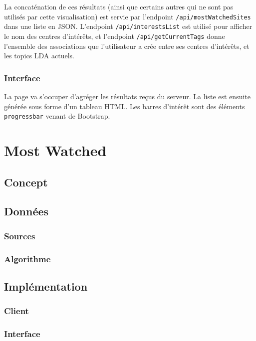 			La concaténation de ces résultats (ainsi que certains autres qui ne sont pas utilisés par cette visualisation) est servie par l'endpoint \texttt{/api/mostWatchedSites} dans une liste en JSON. L'endpoint \texttt{/api/interestsList} est utilisé pour afficher le nom des centres d'intérêts, et l'endpoint \texttt{/api/getCurrentTags} donne l'ensemble des associations que l'utilisateur a crée entre ses centres d'intérêts, et les topics LDA actuels.

		\subsubsection{Interface}

			La page va s'occuper d'agréger les résultats reçus du serveur. La liste est ensuite générée sous forme d'un tableau HTML. Les barres d'intérêt sont des éléments \texttt{progressbar} venant de Bootstrap.

\section{Most Watched}

	\subsection{Concept}

	\subsection{Données}

		\subsubsection{Sources}

		\subsubsection{Algorithme}

	\subsection{Implémentation}

		\subsubsection{Client}

		\subsubsection{Interface}

